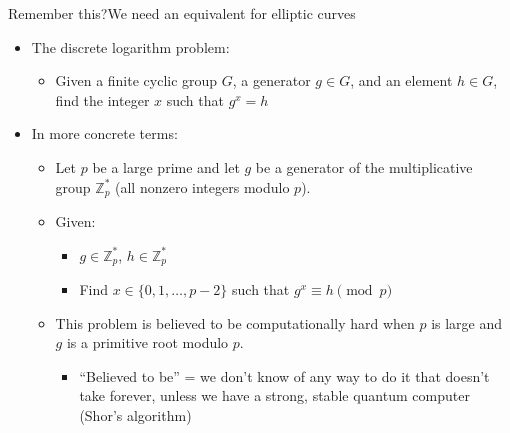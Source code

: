 \documentclass[aspectratio=169, lualatex, handout]{beamer}
\begin{document}
\begin{frame}{Remember this?}{We need an equivalent for elliptic curves}
	\begin{itemize}[<+->]
		\item The discrete logarithm problem:
		      \begin{itemize}
			      \item Given a finite cyclic group $G$, a generator $g \in G$, and an element
			            $h \in G$, find the integer $x$ such that $g^{x}=h$
		      \end{itemize}
		\item In more concrete terms:
		      \begin{itemize}
			      \item Let $p$ be a large prime and let $g$ be a generator of the multiplicative
			            group $\mathbb{Z}_{p}^{*}$ (all nonzero integers modulo $p$).
			      \item Given:
			            \begin{itemize}
				            \item $g \in \mathbb{Z}_{p}^{*}$, $h \in \mathbb{Z}_{p}^{*}$

				            \item Find $x \in \{0, 1, \ldots, p-2\}$ such that $g^{x} \equiv h \pmod
					                  {p}$
			            \end{itemize}
			      \item This problem is believed to be computationally hard when $p$ is large
			            and $g$ is a primitive root modulo $p$.
			            \begin{itemize}
				            \item ``Believed to be'' = we don't know of any way to do it that doesn't
				                  take forever, unless we have a strong, stable quantum computer (Shor's
				                  algorithm)
			            \end{itemize}
		      \end{itemize}
	\end{itemize}
\end{frame}
\end{document}
